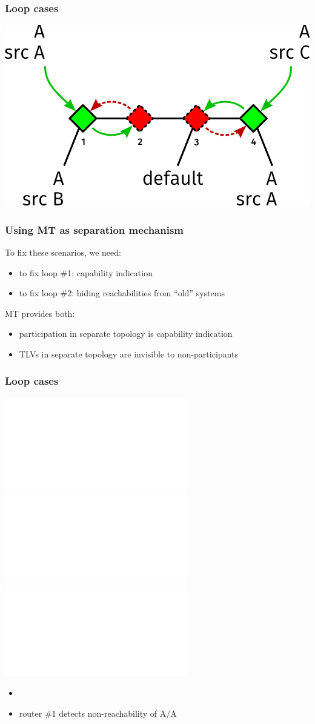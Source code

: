 \documentclass[12pt]{beamer}
\begin{document}
\begin{frame}
  \frametitle{Loop cases}
  \begin{center}
    \includegraphics[scale=0.55,angle=0]{isis_93_loop_base.pdf}%
  \end{center}
\end{frame}

\begin{frame}
  \frametitle{Using MT as separation mechanism}
  To fix these scenarios, we need:
  \begin{itemize}
    \item to fix loop \#1: capability indication
    \item to fix loop \#2: hiding reachabilities from ``old'' systems
  \end{itemize}
  \vspace{5mm}
  MT provides both:
  \begin{itemize}
    \item participation in separate topology is capability indication
    \item TLVs in separate topology are invisible to non-participants
  \end{itemize}
\end{frame}

\begin{frame}
  \frametitle{Loop cases}
  \begin{center}
    \includegraphics<1>[scale=0.55,angle=0]{isis_93_loop_base.pdf}%
    \includegraphics<2>[scale=0.55,angle=0]{isis_93_loop_mt1.pdf}%
    \includegraphics<3>[scale=0.55,angle=0]{isis_93_loop_mt2.pdf}%
  \end{center}
  \begin{itemize}
    \item<2-3> 
    \item<2> router \#1 detects non-reachability of A/A
  \end{itemize}
\end{frame}
\end{document}
